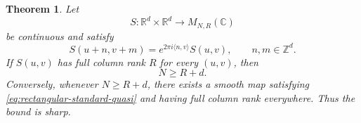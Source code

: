 \documentclass[11pt,reqno]{amsart}
\numberwithin{equation}{section}
\newtheorem{theorem}{Theorem}[section]
\theoremstyle{definition}
\theoremstyle{remark}
\newcommand{\R}{\mathbb R}
\newcommand{\Z}{\mathbb Z}
\newcommand{\C}{\mathbb C}
\newcommand{\ip}[2]{\langle #1,#2\rangle}
\begin{document}
\begin{theorem}
\label{thm:rectangular-common-zero-gap}
Let
\[
 S:\R^d\times\R^d\longrightarrow M_{N,R}(\C)
\]
be continuous and satisfy
\begin{equation}\label{eq:rectangular-standard-quasi}
 S(u+n,v+m)=e^{2\pi i\ip{n}{v}}S(u,v)
 ,\qquad n,m\in\Z^d.
\end{equation}
If $S(u,v)$ has full column rank $R$ for every $(u,v)$, then
\begin{equation}\label{eq:rectangular-gap-conclusion}
                              N\ge R+d.
\end{equation}
Conversely, whenever $N\ge R+d$, there exists a smooth map satisfying
\eqref{eq:rectangular-standard-quasi} and having full column rank everywhere.
Thus the bound is sharp.
\end{theorem}
\end{document}
